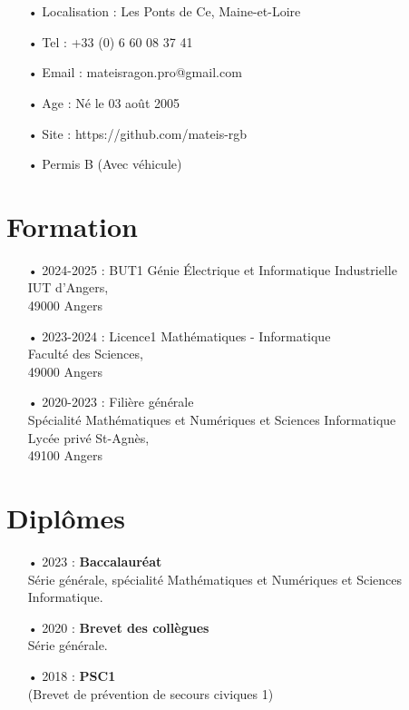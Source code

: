 \documentclass[french]{article}
\begin{document}
\RaggedRight

\section*{}

\begin{itemize}
	\item[•] Localisation : Les Ponts de Ce, Maine-et-Loire
	\item[•] Tel : +33 (0) 6 60 08 37 41
	\item[•] Email : mateisragon.pro@gmail.com
	\item[•] Age : Né le 03 août 2005
	\item[•] Site : https://github.com/mateis-rgb
	\item[•]  Permis B (Avec véhicule)
\end{itemize}
	
\section*{Formation}
\begin{itemize}
	\item[• 2024-2025 :] BUT1 Génie Électrique et Informatique Industrielle \\ IUT d'Angers, \\ 49000 Angers

	\item[• 2023-2024 :] Licence1 Mathématiques - Informatique \\ Faculté des Sciences, \\ 49000 Angers
	
	\item[• 2020-2023 :] Filière générale \\ Spécialité Mathématiques et Numériques et Sciences Informatique \\ Lycée privé St-Agnès, \\ 49100 Angers
\end{itemize}

\section*{Diplômes}
\begin{itemize}
	\item[• 2023 :] \textbf{Baccalauréat} \\ Série générale, spécialité Mathématiques et Numériques et Sciences Informatique.
	
	\item[• 2020 :] \textbf{Brevet des collègues} \\ Série générale.

	\item[• 2018 :] \textbf{PSC1} \\ (Brevet de prévention de secours civiques 1)
\end{itemize}
\end{document}
